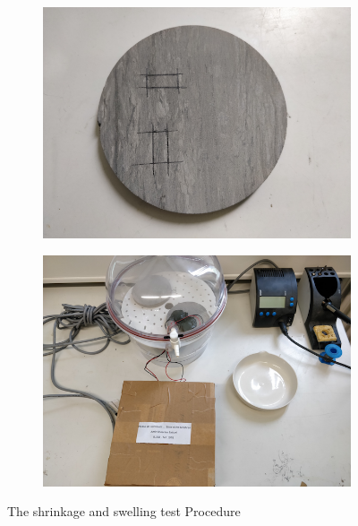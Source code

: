 \begin{figure}[!ht]
\begin{subfigure}[c]{0.48\textwidth}
\includegraphics[width=1\textwidth]{figures/Amir_ME6_Sample.png}
\label{fig:Amir_ME6_Sample}
\end{subfigure}
\hfill
\begin{subfigure}[c]{0.48\textwidth}
\includegraphics[width=1\textwidth]{figures/Amir_ME6_Full_Setup.png}
\label{fig:Amir_ME6_Full_Setup}
\end{subfigure}
\caption{The shrinkage and swelling test Procedure}
\end{figure}


